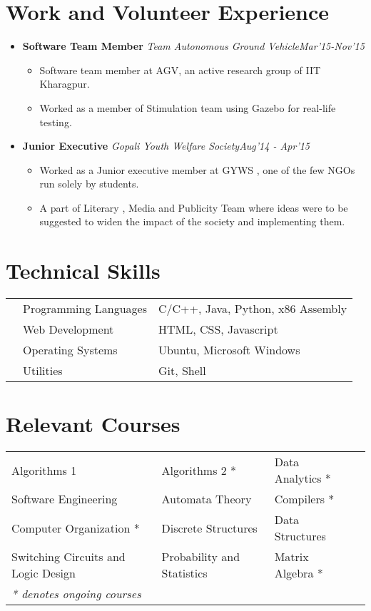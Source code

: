 \documentclass[11pt,a4paper]{moderncv}
\newcommand{\experience}[4]{
  \vspace{0.1cm}
\item \textbf{\large{#1}} \textit{#2}\hfill\textit{#3}
  \begin{itemize}[leftmargin=*]
    \setlength\itemsep{0em} #4
  \end{itemize}
}
\begin{document}
\section*{Work and Volunteer Experience}
\begin{itemize}
  \setlength\itemsep{0.5em}

  \experience{Software Team Member}{Team Autonomous Ground Vehicle}{Mar'15-Nov'15}{
  \item	Software team member at AGV, an active research group of IIT Kharagpur.
  \item	Worked as a member of Stimulation team using Gazebo for real-life testing.
  }
    
  \experience{Junior Executive}{Gopali Youth Welfare Society}{Aug'14 - Apr'15}{
  \item Worked as a Junior executive member at GYWS , one of the few NGOs run solely by students.
  \item A part of Literary , Media and Publicity Team where  ideas were to be suggested to widen the impact of the society and implementing them.
  }

\end{itemize}

\section*{Technical Skills}
\begin{tabular}{L{0.05cm} L{5cm} l}
  &Programming Languages      &C/C++, Java, Python, x86 Assembly\\
  &Web Development              &HTML, CSS, Javascript\\
  &Operating Systems	        &Ubuntu, Microsoft Windows\\
  &Utilities                  &Git, Shell\\
\end{tabular}

\section*{Relevant Courses}
\begin{tabular}{L{7.2cm} L{6.0cm} L{5.6cm}l}
  Algorithms 1 & Algorithms 2 * &
  Data Analytics * \\  Software Engineering & Automata Theory &  Compilers * \\
  Computer Organization *  & Discrete Structures & Data Structures\\
  Switching Circuits and Logic Design &
  Probability and Statistics & Matrix Algebra *\\
  \textit{* denotes ongoing courses} \\
\end{tabular}
\end{document}
